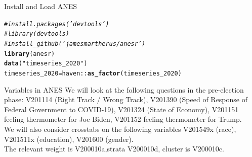 \documentclass{beamer}\usepackage[]{graphicx}\usepackage[]{xcolor}
\makeatletter
\newcommand{\hlstr}[1]{\textcolor[rgb]{0.192,0.494,0.8}{#1}}%
\newcommand{\hlcom}[1]{\textcolor[rgb]{0.678,0.584,0.686}{\textit{#1}}}%
\newcommand{\hlopt}[1]{\textcolor[rgb]{0,0,0}{#1}}%
\newcommand{\hlstd}[1]{\textcolor[rgb]{0.345,0.345,0.345}{#1}}%
\newcommand{\hlkwb}[1]{\textcolor[rgb]{0.69,0.353,0.396}{#1}}%
\newcommand{\hlkwd}[1]{\textcolor[rgb]{0.737,0.353,0.396}{\textbf{#1}}}%
\newenvironment{kframe}{%
 \def\at@end@of@kframe{}%
 \ifinner\ifhmode%
  \def\at@end@of@kframe{\end{minipage}}%
  \begin{minipage}{\columnwidth}%
 \fi\fi%
 \def\FrameCommand##1{\hskip\@totalleftmargin \hskip-\fboxsep
 \colorbox{shadecolor}{##1}\hskip-\fboxsep
     \hskip-\linewidth \hskip-\@totalleftmargin \hskip\columnwidth}%
 \MakeFramed {\advance\hsize-\width
   \@totalleftmargin\z@ \linewidth\hsize
   \@setminipage}}%
 {\par\unskip\endMakeFramed%
 \at@end@of@kframe}
\newenvironment{knitrout}{}{} %
\makeatother
\begin{document}
\begin{frame}[fragile]{Install and Load ANES}
\begin{knitrout}
\color{fgcolor}\begin{kframe}
\begin{alltt}
\hlcom{# install.packages('devtools')}
\hlcom{# library(devtools)}
\hlcom{# install_github('jamesmartherus/anesr')}
\hlkwd{library}\hlstd{(anesr)}
\hlkwd{data}\hlstd{(}\hlstr{"timeseries_2020"}\hlstd{)}
\hlstd{timeseries_2020} \hlkwb{=} \hlstd{haven}\hlopt{::}\hlkwd{as_factor}\hlstd{(timeseries_2020)}
\end{alltt}
\end{kframe}
\end{knitrout}
\end{frame}


\begin{frame}{Variables in ANES}
We will look at the following questions in the pre-election phase:  V201114 (Right Track / Wrong Track), V201390  (Speed of Response of Federal Government to COVID-19), V201324 (State of Economy), V201151 feeling thermometer for Joe Biden, V201152 feeling thermometer for Trump. \\
We will also consider crosstabs on the following variables  V201549x (race), V201511x (education), V201600 (gender). \\
The relevant weight is V200010a,strata V200010d, cluster is V200010c.
\end{frame}

\end{document}
